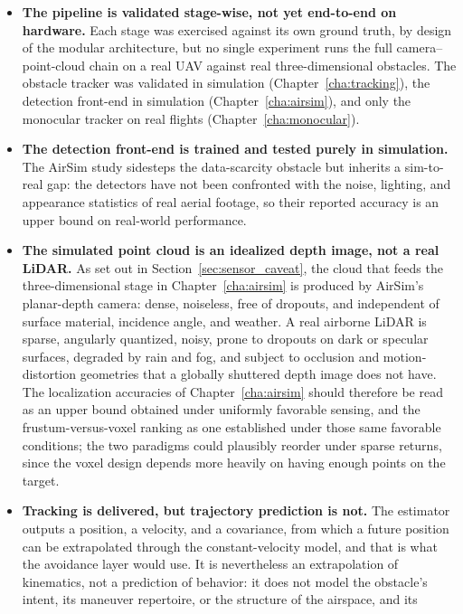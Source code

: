 \begin{itemize}
  \item \textbf{The pipeline is validated stage-wise, not yet end-to-end on
  hardware.} Each stage was exercised against its own ground truth, by design of
  the modular architecture, but no single experiment runs the full
  camera--point-cloud chain on a real UAV against real three-dimensional
  obstacles. The obstacle tracker was validated in simulation
  (Chapter~\ref{cha:tracking}), the detection front-end in simulation
  (Chapter~\ref{cha:airsim}), and only the monocular tracker on real flights
  (Chapter~\ref{cha:monocular}).
  \item \textbf{The detection front-end is trained and tested purely in
  simulation.} The AirSim study sidesteps the data-scarcity obstacle but inherits
  a sim-to-real gap: the detectors have not been confronted with the noise,
  lighting, and appearance statistics of real aerial footage, so their reported
  accuracy is an upper bound on real-world performance.
  \item \textbf{The simulated point cloud is an idealized depth image, not a real
  LiDAR.} As set out in Section~\ref{sec:sensor_caveat}, the cloud that feeds the
  three-dimensional stage in Chapter~\ref{cha:airsim} is produced by AirSim's
  planar-depth camera: dense, noiseless, free of dropouts, and independent of
  surface material, incidence angle, and weather. A real airborne LiDAR is sparse,
  angularly quantized, noisy, prone to dropouts on dark or specular surfaces,
  degraded by rain and fog, and subject to occlusion and motion-distortion
  geometries that a globally shuttered depth image does not have. The localization
  accuracies of Chapter~\ref{cha:airsim} should therefore be read as an upper
  bound obtained under uniformly favorable sensing, and the frustum-versus-voxel
  ranking as one established under those same favorable conditions; the two
  paradigms could plausibly reorder under sparse returns, since the voxel design
  depends more heavily on having enough points on the target.
  \item \textbf{Tracking is delivered, but trajectory prediction is not.} The
  estimator outputs a position, a velocity, and a covariance, from which a future
  position can be extrapolated through the constant-velocity model, and that is
  what the avoidance layer would use. It is nevertheless an extrapolation of
  kinematics, not a prediction of behavior: it does not model the obstacle's
  intent, its maneuver repertoire, or the structure of the airspace, and its

\end{itemize}
